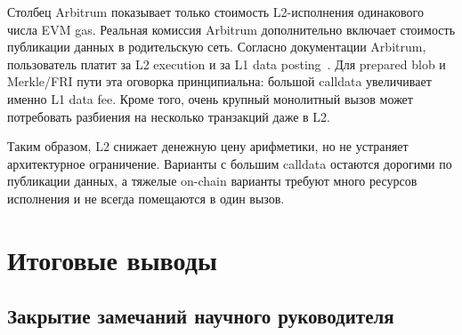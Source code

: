 \documentclass[12pt,a4paper]{article}
\begin{document}
Столбец Arbitrum показывает только стоимость L2-исполнения одинакового числа
EVM gas. Реальная комиссия Arbitrum дополнительно включает стоимость
публикации данных в родительскую сеть. Согласно документации Arbitrum,
пользователь платит за L2 execution и за L1 data posting~\cite{arbitrumFees}.
Для prepared blob и Merkle/FRI пути эта оговорка принципиальна: большой
calldata увеличивает именно L1 data fee. Кроме того, очень крупный монолитный
вызов может потребовать разбиения на несколько транзакций даже в L2.

Таким образом, L2 снижает денежную цену арифметики, но не устраняет
архитектурное ограничение. Варианты с большим calldata остаются дорогими по
публикации данных, а тяжелые on-chain варианты требуют много ресурсов
исполнения и не всегда помещаются в один вызов.

\section{Итоговые выводы}

\subsection{Закрытие замечаний научного руководителя}
\end{document}
